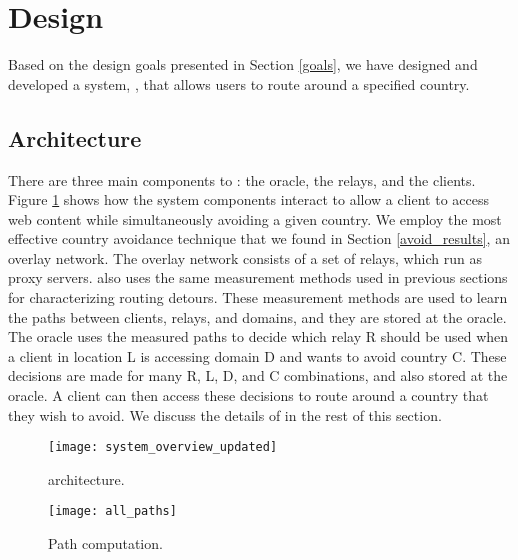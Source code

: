 \section{Design}
\label{system_design}
Based on the design goals presented in Section \ref{goals}, we have designed 
and developed a system, \system{}, that allows users to route around a specified 
country.

\subsection{Architecture}

There are three main components to \system{}: the oracle, the relays, and the 
clients.  Figure \ref{fig:arch} shows how the system components
interact to allow a client to access web content while simultaneously avoiding 
a given country.  We employ the most effective country avoidance technique that 
we found in Section \ref{avoid_results}, an overlay network.  The overlay network 
consists of a set of relays, which run as proxy servers.  \system{} also uses 
the same measurement methods used in previous sections for characterizing routing 
detours.  These measurement methods are used to learn the paths between clients, 
relays, and domains, and they are stored at the oracle.  The oracle uses the 
measured paths to decide which relay R should be used when a client in location L 
is accessing domain D and wants to avoid country C.  These decisions are made 
for many R, L, D, and C combinations, and also stored at the oracle.  A 
client can then access these decisions to route around a country that they wish 
to avoid.  We discuss the details of \system{} in the rest of this section.


\begin{figure*}[htbp]
    \centering
    \begin{subfigure}[b]{0.45\textwidth}
        \texttt{[image: system\_overview\_updated]}
        \caption{\system{} architecture.}
        \label{fig:arch}
    \end{subfigure}
    \begin{subfigure}[b]{0.45\textwidth}
        \texttt{[image: all\_paths]}
        \caption{Path computation.}
    \end{subfigure}
    \caption{}
\end{figure*}

